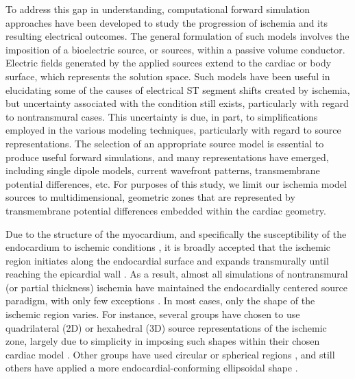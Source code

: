 To address this gap in understanding, computational forward simulation approaches have been developed to study the progression of ischemia and its resulting electrical outcomes.  The general formulation of such models involves the imposition of a bioelectric source, or sources, within a passive volume conductor.  Electric fields generated by the applied sources extend to the cardiac or body surface, which represents the solution space.  Such models have been useful in elucidating some of the causes of electrical ST segment shifts created by ischemia, but uncertainty associated with the condition still exists, particularly with regard to nontransmural cases.  This uncertainty is due, in part, to simplifications employed in the various modeling techniques, particularly with regard to source representations.  The selection of an appropriate source model is essential to produce useful forward simulations, and many representations have emerged, including single dipole models, current wavefront patterns, transmembrane potential differences, etc.  For purposes of this study, we limit our ischemia model sources to multidimensional, geometric zones that are represented by transmembrane potential differences embedded within the cardiac geometry. 


Due to the structure of the myocardium, and specifically the susceptibility of the endocardium to ischemic conditions \cite{KKA:Sal63,KKA:Moi72,KKA:Kje72}, it is  broadly accepted that the ischemic region initiates along the endocardial surface and expands transmurally until reaching the epicardial wall \cite{KKA:Rei77}.  As a result, almost all simulations of nontransmural (or partial thickness) ischemia have maintained the endocardially centered source paradigm, with only few exceptions \cite{BMB:Nie2009,BMB:Swe2010a}.  In most cases, only the shape of the ischemic region varies.  For instance, several groups have chosen to use quadrilateral (2D) or hexahedral (3D) source representations of the ischemic zone, largely due to simplicity in imposing such shapes within their chosen cardiac model \cite{BMB:Hop2005,BMB:Joh2001,BMB:Fra2007,BMB:Jie2010}.  Other groups have used circular or spherical regions \cite{BMB:Mac2007,BMB:Tre2007,BMB:Wil2010}, and still others have applied a more endocardial-conforming ellipsoidal shape \cite{BMB:Li98,BMB:Pul2003}.  

